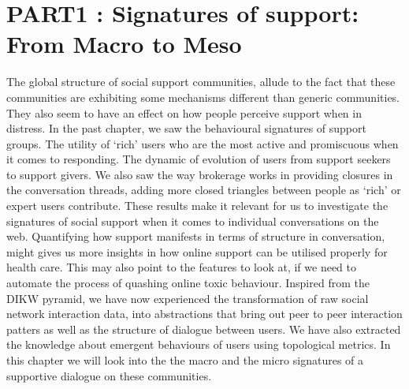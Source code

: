\chapter{PART1 : Signatures of support: From Macro to Meso}
\label{chap:structure_support}
\makeatletter
{}
\makeatother

\graphicspath{{Chapter3/plots/}{Chapter3/plots/figures/}{Chapter3/plots/Zscore/}}

The global structure of social support communities, allude to the fact that these communities are exhibiting some mechanisms different than generic communities. They also seem to have an effect on how people perceive support when in distress. In the past chapter, we saw the behavioural signatures of support groups. The utility of `rich' users who are the most active and promiscuous when it comes to responding. The dynamic of evolution of users from support seekers to support givers. We also saw the way brokerage works in providing closures in the conversation threads, adding more closed triangles between people as `rich' or expert users contribute. These results make it relevant for us to investigate the signatures of social support when it comes to individual conversations on the web. Quantifying how support manifests in terms of structure in conversation, might gives us more insights in how online support can be utilised properly for health care. This may also point to the features to look at, if we need to automate the process of quashing online toxic behaviour.
Inspired from the DIKW pyramid, we have now experienced the transformation of raw social network interaction data, into abstractions that bring out peer to peer interaction patters as well as the structure of dialogue between users. We have also extracted the knowledge about emergent behaviours of users using topological metrics. In this chapter we will look into the the macro and the micro signatures of a supportive dialogue on these communities.

